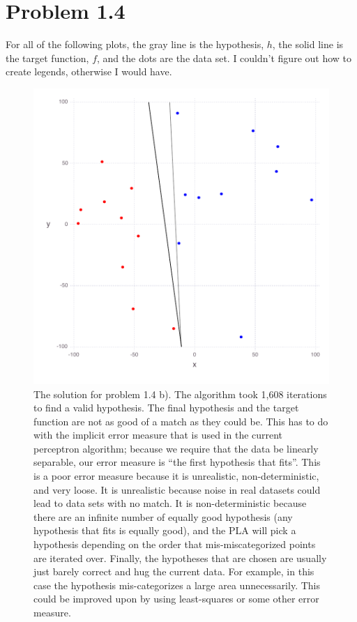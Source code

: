 \documentclass[11pt,letterpaper]{article}
\begin{document}
\section*{Problem 1.4}
For all of the following plots, the gray line is the hypothesis, $h$, the solid line is the target function, $f$, and the dots are the data set.  I couldn't figure out how to create legends, otherwise I would have.

\begin{figure}
	\centering
    \includegraphics[width=\textwidth]{problem_1_4b.pdf}
	\caption{The solution for problem 1.4 b).  The algorithm took 1,608 iterations to find a valid hypothesis. The final hypothesis and the target function are not as good of a match as they could be.  This has to do with the implicit error measure that is used in the current perceptron algorithm; because we require that the data be linearly separable, our error measure is ``the first hypothesis that fits''.  This is a poor error measure because it is unrealistic, non-deterministic, and very loose.  It is unrealistic because noise in real datasets could lead to data sets with no match.  It is non-deterministic because there are an infinite number of equally good hypothesis (any hypothesis that fits is equally good), and the PLA will pick a hypothesis depending on the order that mis-miscategorized points are iterated over.  Finally, the hypotheses that are chosen are usually just barely correct and hug the current data.  For example, in this case the hypothesis mis-categorizes a large area unnecessarily.  This could be improved upon by using least-squares or some other error measure.}
\end{figure}
\end{document}
